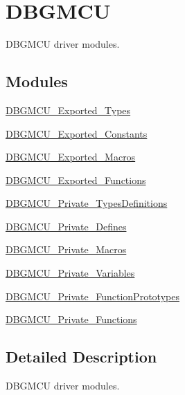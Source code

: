 \hypertarget{group___d_b_g_m_c_u}{}\section{D\+B\+G\+M\+CU}
\label{group___d_b_g_m_c_u}


D\+B\+G\+M\+CU driver modules.  


\subsection*{Modules}
\begin{DoxyCompactItemize}
\item 
\hyperlink{group___d_b_g_m_c_u___exported___types}{D\+B\+G\+M\+C\+U\+\_\+\+Exported\+\_\+\+Types}
\item 
\hyperlink{group___d_b_g_m_c_u___exported___constants}{D\+B\+G\+M\+C\+U\+\_\+\+Exported\+\_\+\+Constants}
\item 
\hyperlink{group___d_b_g_m_c_u___exported___macros}{D\+B\+G\+M\+C\+U\+\_\+\+Exported\+\_\+\+Macros}
\item 
\hyperlink{group___d_b_g_m_c_u___exported___functions}{D\+B\+G\+M\+C\+U\+\_\+\+Exported\+\_\+\+Functions}
\item 
\hyperlink{group___d_b_g_m_c_u___private___types_definitions}{D\+B\+G\+M\+C\+U\+\_\+\+Private\+\_\+\+Types\+Definitions}
\item 
\hyperlink{group___d_b_g_m_c_u___private___defines}{D\+B\+G\+M\+C\+U\+\_\+\+Private\+\_\+\+Defines}
\item 
\hyperlink{group___d_b_g_m_c_u___private___macros}{D\+B\+G\+M\+C\+U\+\_\+\+Private\+\_\+\+Macros}
\item 
\hyperlink{group___d_b_g_m_c_u___private___variables}{D\+B\+G\+M\+C\+U\+\_\+\+Private\+\_\+\+Variables}
\item 
\hyperlink{group___d_b_g_m_c_u___private___function_prototypes}{D\+B\+G\+M\+C\+U\+\_\+\+Private\+\_\+\+Function\+Prototypes}
\item 
\hyperlink{group___d_b_g_m_c_u___private___functions}{D\+B\+G\+M\+C\+U\+\_\+\+Private\+\_\+\+Functions}
\end{DoxyCompactItemize}


\subsection{Detailed Description}
D\+B\+G\+M\+CU driver modules. 

